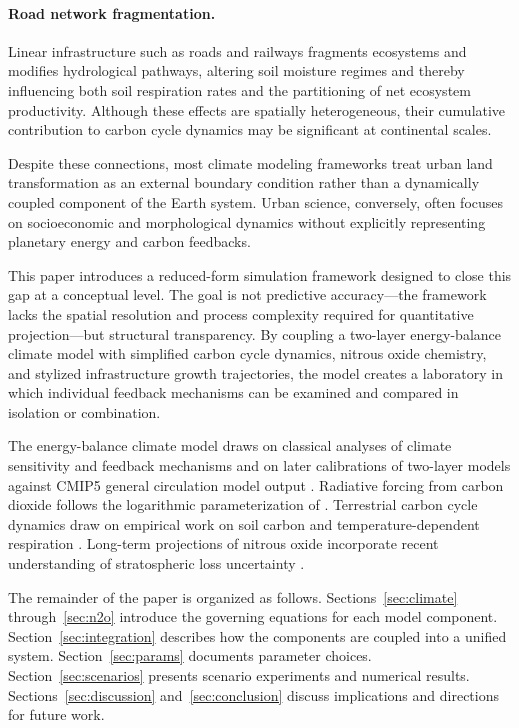 \documentclass[12pt]{article}
\begin{document}
\paragraph{Road network fragmentation.}
Linear infrastructure such as roads and railways fragments ecosystems and
modifies hydrological pathways, altering soil moisture regimes and thereby
influencing both soil respiration rates and the partitioning of net ecosystem
productivity.  Although these effects are spatially heterogeneous, their
cumulative contribution to carbon cycle dynamics may be significant at
continental scales.

Despite these connections, most climate modeling frameworks treat urban land
transformation as an external boundary condition rather than a dynamically
coupled component of the Earth system.  Urban science, conversely, often focuses
on socioeconomic and morphological dynamics without explicitly representing
planetary energy and carbon feedbacks.

This paper introduces a reduced-form simulation framework designed to close this
gap at a conceptual level.  The goal is not predictive accuracy---the framework
lacks the spatial resolution and process complexity required for quantitative
projection---but structural transparency.  By coupling a two-layer energy-balance
climate model with simplified carbon cycle dynamics, nitrous oxide chemistry, and
stylized infrastructure growth trajectories, the model creates a laboratory in
which individual feedback mechanisms can be examined and compared in isolation or
combination.

The energy-balance climate model draws on classical analyses of climate
sensitivity and feedback mechanisms \citep{Hansen1984} and on later calibrations
of two-layer models against CMIP5 general circulation model output
\citep{Geoffroy2013}.  Radiative forcing from carbon dioxide follows the
logarithmic parameterization of \citet{Myhre1998}.  Terrestrial carbon cycle
dynamics draw on empirical work on soil carbon and temperature-dependent
respiration \citep{Parton1987,LloydTaylor1994,Davidson2006}.  Long-term
projections of nitrous oxide incorporate recent understanding of stratospheric
loss uncertainty \citep{Prather2026}.

The remainder of the paper is organized as follows.  Sections~\ref{sec:climate}
through~\ref{sec:n2o} introduce the governing equations for each model
component.  Section~\ref{sec:integration} describes how the components are
coupled into a unified system.  Section~\ref{sec:params} documents parameter
choices.  Section~\ref{sec:scenarios} presents scenario experiments and
numerical results.  Sections~\ref{sec:discussion} and~\ref{sec:conclusion}
discuss implications and directions for future work.
\end{document}
